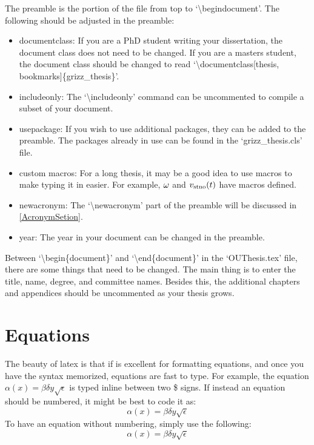 The preamble is the portion of the file from top to `\textbackslash begin{document}'. The following should be adjusted in the preamble:
\begin{itemize}
	\item documentclass: If you are a PhD student writing your dissertation, the document class does not need to be changed.
If you are a masters student, the document class should be changed to read `\textbackslash documentclass[thesis, bookmarks]\{grizz\_thesis\}'.

	\item includeonly: The `\textbackslash includeonly{}' command can be uncommented to compile a subset of your document.

	\item usepackage: If you wish to use additional packages, they can be added to the preamble. 
The packages already in use can be found in the `grizz\_thesis.cls' file.

	\item custom macros: For a long thesis, it may be a good idea to use macros to make typing it in easier. 
For example, $\omega$ and $v_{\rm stno}(t)$ have macros defined.

	\item newacronym: The `\textbackslash newacronym' part of the preamble will be discussed in \autoref{AcronymSetion}.

	\item year: The year in your document can be changed in the preamble.
\end{itemize}

Between `\textbackslash begin\{document\}' and `\textbackslash end\{document\}' in the `OUThesis.tex' file, there are some things that need to be changed. 
The main thing is to enter the title, name, degree, and committee names. 
Besides this, the additional chapters and appendices should be uncommented as your thesis grows.



\section{Equations}

The beauty of latex is that if is excellent for formatting equations, and once you have the syntax memorized, equations are fast to type. 
For example, the equation $\alpha(x) = \beta\delta y\sqrt{\epsilon}$ is typed inline between two \$ signs. 
If instead an equation should be numbered, it might be best to code it as:
\begin{equation} \alpha(x) = \beta\delta y\sqrt{\epsilon} \label{first}\end{equation}
To have an equation without numbering, simply use the following:
\[\alpha(x) = \beta\delta y\sqrt{\epsilon}\]

